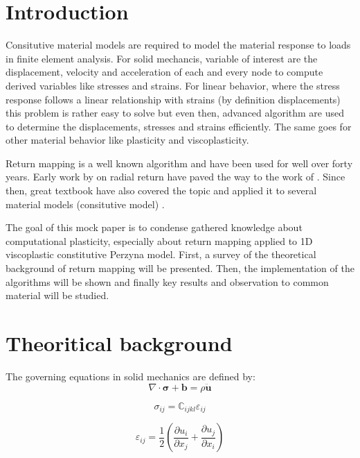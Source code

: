 \documentclass[final,5p,times,twocolumn]{elsarticle}
\begin{document}
\section{Introduction}
\label{sect:intro}
Consitutive material models are required to model the material response to loads in finite element analysis. For solid mechancis, variable of interest are the displacement, velocity and acceleration of each and every node to compute derived variables like stresses and strains. For linear behavior, where the stress response follows a linear relationship with strains (by definition displacements) this problem is rather easy to solve but even then, advanced algorithm are used to determine the displacements, stresses and strains efficiently. The same goes for other material behavior like plasticity and viscoplasticity.

Return mapping is a well known algorithm and have been used for well over forty years. Early work by \cite{Krieg1977RadialReturn} on radial return have paved the way to the work of \cite{Ortiz1985ElastoplasticIntegration}. Since then, great textbook have also covered the topic and applied it to several material models (consitutive model)\cite{Simo1998Computational} \cite{MACrisfield2012}.

The goal of this mock paper is to condense gathered knowledge about computational plasticity, especially about return mapping applied to 1D viscoplastic constitutive Perzyna model. First, a survey of the theoretical background of return mapping will be presented. Then, the implementation of the algorithms will be shown and finally key results and observation to common material will be studied.

\section{Theoritical background}
\label{sect:theoriticalbackground}
The governing equations in solid mechanics are defined by:
\begin{equation}
  \nabla \cdot \boldsymbol{\sigma} + \boldsymbol{b} = \rho \ddot{\boldsymbol{u}} \label{eq:equilibrium}
\end{equation}

\begin{equation}
   \sigma_{ij}=\mathbb{C}_{ijkl} \varepsilon_{ij} \label{eq:constitutive}
\end{equation} 

\begin{equation} \varepsilon_{ij}=\dfrac{1}{2} \left(\dfrac{\partial u_{i}}{\partial x_{j}} 
                + \dfrac{\partial u_{j}}{\partial x_{i}} \right) \label{eq:straindisprel}
\end{equation}
\end{document}
